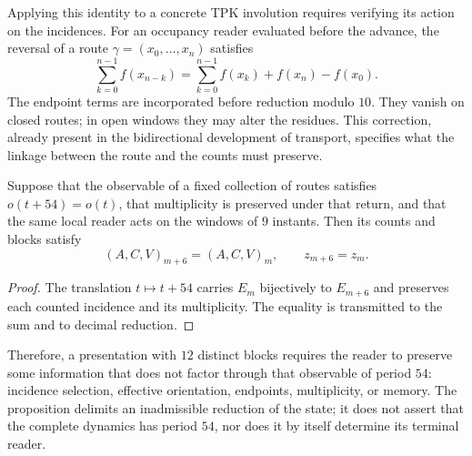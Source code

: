 Applying this identity to a concrete TPK involution requires verifying its
action on the incidences. For an occupancy reader evaluated before the
advance, the reversal of a route
\(\gamma=(x_0,\ldots,x_n)\) satisfies
\[
 \sum_{k=0}^{n-1}f(x_{n-k})
 =\sum_{k=0}^{n-1}f(x_k)+f(x_n)-f(x_0).
\]
The endpoint terms are incorporated before reduction modulo \(10\). They
vanish on closed routes; in open windows they may alter the residues. This
correction, already present in the bidirectional development of transport,
specifies what the linkage between the route and the counts must preserve.

\begin{proposition}
Suppose that the observable of a fixed collection of routes satisfies
\(o(t+54)=o(t)\), that multiplicity is preserved under that return, and that
the same local reader acts on the windows of \(9\) instants. Then its counts
and blocks satisfy
\[
 (A,C,V)_{m+6}=(A,C,V)_m,\qquad z_{m+6}=z_m.
\]
\end{proposition}

\begin{proof}
The translation \(t\mapsto t+54\) carries \(E_m\) bijectively to
\(E_{m+6}\) and preserves each counted incidence and its multiplicity. The
equality is transmitted to the sum and to decimal reduction.
\end{proof}

Therefore, a presentation with \(12\) distinct blocks requires the reader to
preserve some information that does not factor through that observable of
period \(54\): incidence selection, effective orientation, endpoints,
multiplicity, or memory. The proposition delimits an inadmissible reduction
of the state; it does not assert that the complete dynamics has period \(54\),
nor does it by itself determine its terminal reader.
